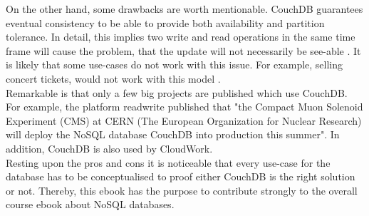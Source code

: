 On the other hand, some drawbacks are worth mentionable.
CouchDB guarantees eventual consistency to be able to provide both availability and partition tolerance. In detail, this implies two write and read operations in the same time frame will cause the problem, that the update will not necessarily be see-able \cite{EminGunSirer}.
It is likely that some use-cases do not work with this issue. For example, selling concert tickets, would not work with this model \cite{EminGunSirer}. \\
%
%
%
%
%
%
%
Remarkable is that only a few big projects are published which use CouchDB. For example, the platform readwrite published that "the Compact Muon Solenoid Experiment (CMS) at CERN (The European Organization for Nuclear Research) will deploy the NoSQL database CouchDB into production this summer"\cite{KLINTFINLEY.2010}. In addition, CouchDB is also used by CloudWork\cite{BrunoPedro.2013}. \\
Resting upon the pros and cons it is noticeable that every use-case for the database has to be conceptualised to proof either CouchDB is the right solution or not. Thereby, this ebook has the purpose to contribute strongly to the overall course ebook about NoSQL databases. 

